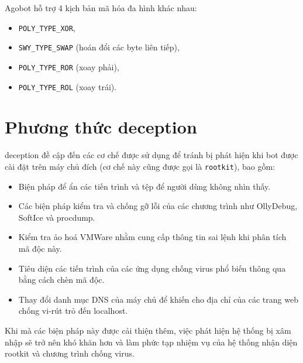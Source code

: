 Agobot hỗ trợ 4 kịch bản mã hóa đa hình khác nhau:

\begin{itemize}
\item \verb|POLY_TYPE_XOR|,
\item \verb|SWY_TYPE_SWAP| (hoán đổi các byte liên tiếp),
\item \verb|POLY_TYPE_ROR| (xoay phải),
\item \verb|POLY_TYPE_ROL| (xoay trái).
\end{itemize}

\section{Phương thức deception}

\Gls{deception} đề cập đến các cơ chế được sử dụng để tránh bị phát hiện khi bot được cài đặt
trên máy chủ đích (cơ chế này cũng được gọi là \texttt{rootkit}), bao gồm:

\begin{itemize}
\item Biện pháp để ẩn các tiến trình và tệp để người dùng không nhìn thấy.
\item Các biện pháp kiểm tra và chống gỡ lỗi của các chương trình như OllyDebug, SoftIce và procdump.
\item Kiểm tra ảo hoá VMWare nhằm cung cấp thông tin sai lệnh khi phân tích mã độc này.
\item Tiêu diện các tiến trình của các ứng dụng chống virus phổ biến thông qua bằng cách chèn mã độc.
\item Thay đổi danh mục DNS của máy chủ để khiến cho địa chỉ của các trang web chống vi-rút trỏ đến localhost.

\end{itemize}

Khi mà các biện pháp này được cải thiện thêm, việc phát hiện hệ thống bị xâm nhập sẽ trở nên khó khăn hơn và làm phức tạp
nhiệm vụ của hệ thống nhận diện rootkit và chương trình chống virus.



